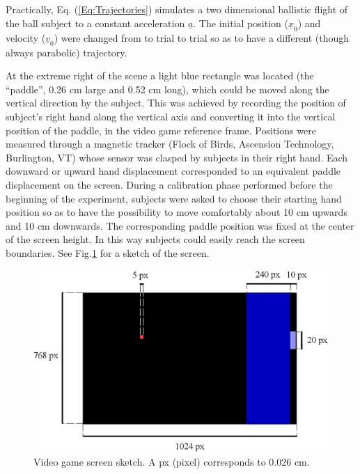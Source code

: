 Practically, Eq. (\ref{Eq:Trajectories}) simulates a two dimensional ballistic flight of the ball
subject to a constant acceleration $\underline{a}$. The initial position ($\underline{x}_0$) and velocity ($\underline{v}_0$) were changed from to trial to trial so as to have a different (though always parabolic) trajectory.

At the extreme right of the scene a light blue rectangle was located (the ``paddle'', 0.26 cm large and 0.52 cm long), which could be moved along the vertical direction by the subject. This was achieved by recording the position of subject's right hand along the vertical axis and converting it into the vertical position of the paddle, in the video game reference frame. 
Positions were measured through a magnetic tracker (Flock of Birds, Ascension Technology, Burlington, VT) whose sensor was clasped by subjects in their right hand. Each downward or upward hand displacement corresponded to an equivalent paddle displacement on the screen. During a calibration phase performed before the beginning of the experiment, subjects were asked to choose their starting hand position so as to have the possibility to move comfortably about 10 cm upwards and 10 cm downwards. The corresponding paddle position was fixed at the center of the screen height. In this way subjects could easily reach the screen boundaries.
See Fig.\ref{figSchemaPong} for a sketch of the screen.

\begin{figure}[tbp]
	\centering
		\includegraphics[width=15cm]{fig/schema_pong.eps}
	\caption{Video game screen sketch. A px (pixel) corresponds to 0.026 cm.}
	\label{figSchemaPong}
\end{figure}




